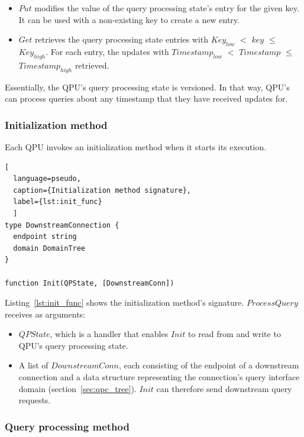 \begin{itemize}
  \item $Put$ modifies the value of the query processing state's entry for the given key.
  It can be used with a non-existing key to create a new entry.

  \item $Get$ retrieves the query processing state entries with $Key_{low}$ $<$ $key$ $\leq$ $Key_{high}$.
  For each entry, the updates with $Timestamp_{low}$ $<$ $Timestamp$ $\leq$ $Timestamp_{high}$ retrieved.
\end{itemize}

Essentially, the QPU's query processing state is versioned.
In that way, QPU's can process queries about any timestamp that they have received updates for.


\subsubsection{Initialization method}
\label{sec:initialization_func}

Each QPU invokes an initialization method when it starts its execution.

\begin{lstlisting}[
  language=pseudo,
  caption={Initialization method signature},
  label={lst:init_func}
  ]
type DownstreamConnection {
  endpoint string
  domain DomainTree
}

function Init(QPState, [DownstreamConn])
\end{lstlisting}

\noindent
Listing~\ref{lst:init_func} shows the initialization method's signature.
$ProcessQuery$ receives as arguments:
\begin{itemize}
  \item $QPState$, which is a handler that enables $Init$ to read from and write to QPU's query processing state.

  \item A list of $DownstreamConn$, each consisting of the endpoint of a downstream connection and a data structure
  representing the connection's query interface domain (section~\ref{sec:qpc_tree}).
  $Init$ can therefore send downstream query requests.
\end{itemize}


\subsubsection{Query processing method}
\label{sec:query_processing_func}

